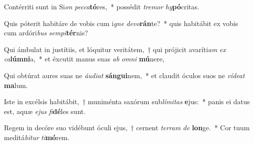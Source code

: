\item Contérriti sunt in Si\textit{on} \textit{pec}\textit{ca}\textbf{tó}res,~* possédit \textit{tre}\textit{mor} \textit{hy}\textbf{pó}critas.
\item Quis póterit habitáre de vobis cum i\textit{gne} \textit{de}\textit{vo}\textbf{rán}te?~* quis habitábit ex vobis cum ardóri\textit{bus} \textit{sem}\textit{pi}\textbf{tér}nis?
\item Qui ámbulat in justítiis, et lóquitur veritátem,~† qui prójicit avaríti\textit{am} \textit{ex} \textit{ca}\textbf{lúm}\textbf{ni}a,~* et éxcutit manus suas \textit{ab} \textit{om}\textit{ni} \textbf{mú}nere,
\item Qui obtúrat aures suas ne \textit{áu}\textit{di}\textit{at} \textbf{sán}\textbf{gui}nem,~* et claudit óculos suos ne \textit{ví}\textit{de}\textit{at} \textbf{ma}lum.
\item Iste in excélsis habitábit,~† muniménta saxórum sub\textit{lí}\textit{mi}\textit{tas} \textbf{e}jus:~* panis ei datus est, aquæ \textit{e}\textit{jus} \textit{fi}\textbf{dé}les sunt.
\item Regem in decóre suo vidébunt óculi ejus,~† cernent \textit{ter}\textit{ram} \textit{de} \textbf{lon}ge.~* Cor tuum meditá\textit{bi}\textit{tur} \textit{ti}\textbf{mó}rem.
